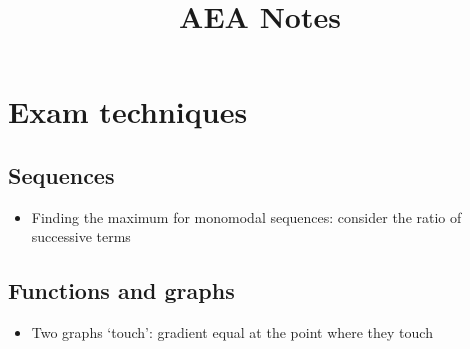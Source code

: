 \documentclass[oneside,fleqn,11pt]{book}
\title{AEA Notes}
\begin{document}
\everymath{\displaystyle}
\maketitle

\chapter{Exam techniques}
\section{Sequences}
\begin{itemize}
    \item Finding the maximum for monomodal sequences: consider the ratio of successive terms
\end{itemize}

\section{Functions and graphs}
\begin{itemize}
    \item Two graphs `touch': gradient equal at the point where they touch
\end{itemize}
\end{document}
